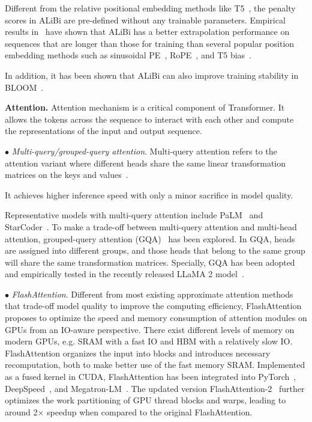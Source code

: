     {Different from the relative positional embedding methods like T5~\cite{Raffel-JMLR-2020-Exploring}, the penalty scores in ALiBi are pre-defined without any trainable parameters.} Empirical results in~\cite{Press-ICLR-2022-Train} have shown that ALiBi has {a better extrapolation performance on sequences that are longer than those for training than several popular position embedding methods such as  sinusoidal PE~\cite{Vaswani-NIPS-2017-Attention}, RoPE~\cite{Su-arxiv-2021-Roformer}, and T5 bias~\cite{Raffel-JMLR-2020-Exploring}. }

    In addition, it has been shown that ALiBi can also improve training stability in BLOOM~\cite{Scao-arxiv-2022-BLOOM}.

\textbf{Attention.} 
Attention mechanism is a critical component of Transformer. It allows the tokens across the sequence to interact with each other and compute the representations of the input and output sequence. 

    $\bullet$ \emph{Multi-query/grouped-query attention}. Multi-query attention refers to the attention variant where different heads share  {the same  linear transformation matrices on the keys and values~\cite{Shazeer-2019-arxiv-Fast}.} 

    It achieves higher inference speed {with only a minor sacrifice in model quality.}

    Representative models with multi-query attention include PaLM~\cite{Chowdhery-arxiv-2022-PaLM} and StarCoder~\cite{Li-2023-arxiv-Starcoder}. {To make a trade-off between multi-query attention and multi-head attention, grouped-query attention (GQA)~\cite{Ainslie-2023-arxiv-gqa} has been explored. In GQA, heads are assigned into different groups, and those heads that belong to the same group will share the same transformation matrices. Specially, GQA has been adopted and empirically tested in the recently released LLaMA 2 model~\cite{Touvron-2023-llama2-arxiv}.}

    $\bullet$ \emph{FlashAttention}. Different from most existing approximate attention methods that trade-off model quality to improve the computing efficiency, FlashAttention~\cite{Dao-NeurIPS-2020-FLASH} proposes to optimize the speed and memory consumption of attention modules on GPUs from an IO-aware perspective. There exist different levels of memory on modern GPUs, e.g. SRAM with a fast IO and HBM with a relatively slow IO. FlashAttention organizes the input into blocks and introduces necessary recomputation, both to make better use of the fast memory SRAM.  Implemented as a fused kernel in CUDA, FlashAttention has been integrated into PyTorch~\cite{Paszke-NeurIPS-2019-Pytorch}, DeepSpeed~\cite{Rasley-KDD-2020-DeepSpeed}, and Megatron-LM~\cite{Shoeybi-arXiv-2019-Megatron}. {The updated version FlashAttention-2~\cite{Dao-2023-arxiv-flashattention2} further optimizes the work partitioning of GPU thread blocks and warps, leading to around 2$\times$ speedup when compared to the original FlashAttention.}

